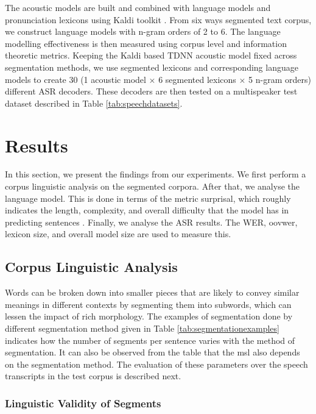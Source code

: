 The acoustic models are built and combined with language models and
pronunciation lexicons using Kaldi toolkit \cite{povey2011kaldi}. From six ways
segmented text corpus, we construct language models with n-gram orders of 2 to
6. The language modelling effectiveness is then measured using corpus level and
information theoretic metrics. Keeping the Kaldi based TDNN acoustic model
fixed across segmentation methods, we use segmented lexicons and corresponding
language models to create 30 (1 acoustic model × 6 segmented lexicons × 5 n-gram
orders) different ASR decoders. These decoders are then tested on a
multispeaker test dataset described in Table \ref{tab:speechdatasets}.

\section{Results}

In this section, we present the findings from our experiments. We first perform
a corpus linguistic analysis on the segmented corpora. After that, we analyse
the language model. This is done in terms of the metric surprisal, which
roughly indicates the length, complexity, and overall difficulty that the model
has in predicting sentences \cite{mielke-etal-2019-kind}. Finally, we analyse
the ASR results. The WER, \gls{oovwer}, lexicon size, and overall model size are
used to measure this.

\subsection{Corpus Linguistic Analysis}

Words can be broken down into smaller pieces that are likely to convey similar
meanings in different contexts by segmenting them into subwords, which can
lessen the impact of rich morphology. The examples of segmentation done by
different segmentation method given in Table \ref{tab:segmentationexamples}
indicates how the number of segments per sentence varies with the method of
segmentation. It can also be observed from the table that the \gls{msl} also depends on the segmentation method. The evaluation of these
parameters over the speech transcripts in the test corpus is described next.


\subsubsection{Linguistic Validity of Segments}

